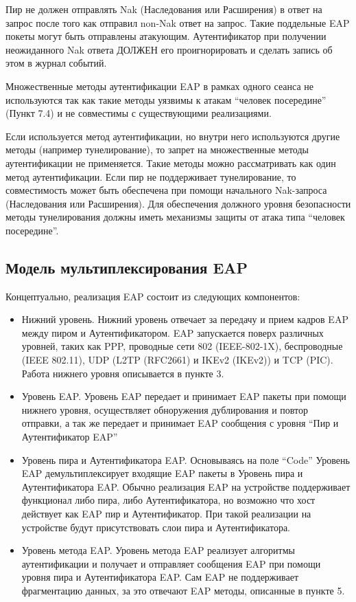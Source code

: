Пир не должен отправлять Nak (Наследования или Расширения) в ответ на запрос после того как отправил non-Nak ответ на запрос. Такие поддельные EAP покеты могут быть отправлены атакующим. Аутентификатор при получении неожиданного Nak ответа ДОЛЖЕН его проигнорировать и сделать запись об этом в журнал событий.

Множественные методы аутентификации EAP в рамках одного сеанса не используются так как такие методы уязвимы к атакам ``человек посередине'' (Пункт 7.4) и не совместимы с существующими реализациями.

Если используется метод аутентификации, но внутри него используются другие методы (например тунелирование), то запрет на множественные методы аутентификации не применяется. Такие методы можно рассматривать как один метод аутентификации. Если пир не поддерживает тунелирование, то совместимость может быть обеспечена при помощи начального Nak-запроса (Наследования или Расширения). Для обеспечения должного уровня безопасности методы тунелирования должны иметь механизмы защиты от атака типа ``человек посередине''.

\subsection{Модель мультиплексирования EAP}

Концептуально, реализация EAP состоит из следующих компонентов:

\begin{itemize}
\item Нижний уровень. Нижний уровень отвечает за передачу и прием кадров EAP между пиром и Аутентификатором. EAP запускается поверх различных уровней, таких как PPP, проводные сети 802 (IEEE-802-1X), беспроводные (IEEE 802.11), UDP (L2TP (RFC2661) и IKEv2 (IKEv2)) и TCP (PIC). Работа нижнего уровня описывается в пункте 3.
\item Уровень EAP. Уровень EAP передает и принимает EAP пакеты при помощи нижнего уровня, осуществляет обноружения дублирования и повтор отправки, а так же передает и принимает EAP сообщения с уровня ``Пир и Аутентификатор EAP''
\item Уровень пира и Аутентификатора EAP. Основываясь на поле ``Code'' Уровень EAP демультиплексирует входящие EAP пакеты в Уровень пира и Аутентификатора EAP. Обычно реализация EAP на устройстве поддерживает функционал либо пира, либо Аутентификатора, но возможно что хост действует как EAP пир и Аутентификатор. При такой реализации на устройстве будут присутствовать слои пира и Аутентификатора.
\item Уровень метода EAP. Уровень метода EAP реализует алгоритмы аутентификации и получает и отправляет сообщения EAP при помощи уровня пира и Аутентификатора EAP. Сам EAP не поддерживает фрагментацию данных, за это отвечают EAP методы, описанные в пункте 5.
\end{itemize}

